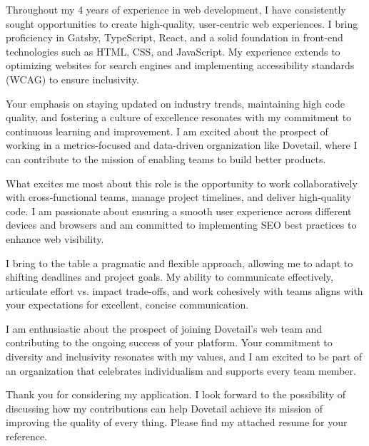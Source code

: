 \documentclass[12pt, a4paper]{./awesome-cv/awesome-cv}
\begin{document}
\begin{cvletter}
Throughout my 4 years of experience in web development, I have consistently sought opportunities to create high-quality, user-centric web experiences. I bring proficiency in Gatsby, TypeScript, React, and a solid foundation in front-end technologies such as HTML, CSS, and JavaScript. My experience extends to optimizing websites for search engines and implementing accessibility standards (WCAG) to ensure inclusivity.

Your emphasis on staying updated on industry trends, maintaining high code quality, and fostering a culture of excellence resonates with my commitment to continuous learning and improvement. I am excited about the prospect of working in a metrics-focused and data-driven organization like Dovetail, where I can contribute to the mission of enabling teams to build better products.

What excites me most about this role is the opportunity to work collaboratively with cross-functional teams, manage project timelines, and deliver high-quality code. I am passionate about ensuring a smooth user experience across different devices and browsers and am committed to implementing SEO best practices to enhance web visibility.

I bring to the table a pragmatic and flexible approach, allowing me to adapt to shifting deadlines and project goals. My ability to communicate effectively, articulate effort vs. impact trade-offs, and work cohesively with teams aligns with your expectations for excellent, concise communication.

I am enthusiastic about the prospect of joining Dovetail's web team and contributing to the ongoing success of your platform. Your commitment to diversity and inclusivity resonates with my values, and I am excited to be part of an organization that celebrates individualism and supports every team member.

Thank you for considering my application. I look forward to the possibility of discussing how my contributions can help Dovetail achieve its mission of improving the quality of every thing. Please find my attached resume for your reference.


\end{cvletter}




\makeletterclosing
\end{document}
